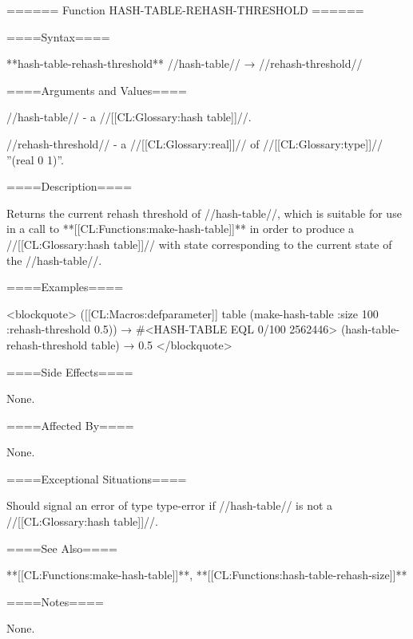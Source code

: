 ====== Function HASH-TABLE-REHASH-THRESHOLD ======

====Syntax====

**hash-table-rehash-threshold** //hash-table// → //rehash-threshold//

====Arguments and Values====

//hash-table// - a //[[CL:Glossary:hash table]]//.

//rehash-threshold// - a //[[CL:Glossary:real]]// of //[[CL:Glossary:type]]// ''(real 0 1)''.

====Description====

Returns the current rehash threshold of //hash-table//, which is suitable for use in a call to **[[CL:Functions:make-hash-table]]** in order to produce a //[[CL:Glossary:hash table]]// with state corresponding to the current state of the //hash-table//.

====Examples====

<blockquote> ([[CL:Macros:defparameter]] table (make-hash-table :size 100 :rehash-threshold 0.5)) → #<HASH-TABLE EQL 0/100 2562446> (hash-table-rehash-threshold table) → 0.5 </blockquote>

====Side Effects====

None.

====Affected By====

None.

====Exceptional Situations====

Should signal an error of type type-error if //hash-table// is not a //[[CL:Glossary:hash table]]//.

====See Also====

**[[CL:Functions:make-hash-table]]**, **[[CL:Functions:hash-table-rehash-size]]**

====Notes====

None.

 
